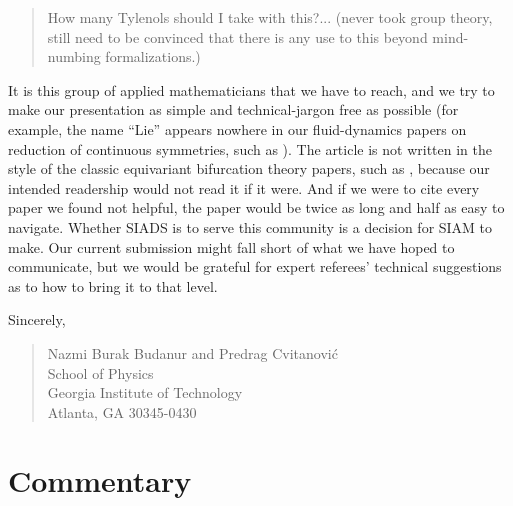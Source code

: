 \documentclass[12pt]{article}
\begin{document}
\begin{quote}
How many Tylenols should I take with this?...
(never took group theory, still need to be convinced
that there is any use to this beyond mind-numbing formalizations.)
\end{quote}

It is this group of applied mathematicians that we have to reach, and we
try to make our presentation as simple and technical-jargon free as
possible (for example, the name ``Lie'' appears nowhere in our
fluid-dynamics papers on reduction of continuous symmetries, such as
). The article is not written in the style of the classic
equivariant bifurcation theory papers, such as ,
because our intended readership would not read it if it were. And if we
were to cite every paper we found not helpful, the paper would be twice
as long and half as easy to navigate. Whether SIADS is to serve this
community is a decision for SIAM to make. Our current submission might
fall short of what we have hoped to communicate, but we would be grateful
for expert referees' technical suggestions as to how to bring it to that
level.

\bigskip
\bigskip
\bigskip

\noindent
Sincerely,
            \begin{quote}
            Nazmi Burak Budanur
            and
            Predrag Cvitanovi\'c \\
School of Physics\\
Georgia Institute of Technology\\
Atlanta, GA 30345-0430\\
\end{quote}




\newpage

\section{Commentary}
\label{sect:coment}
\end{document}
